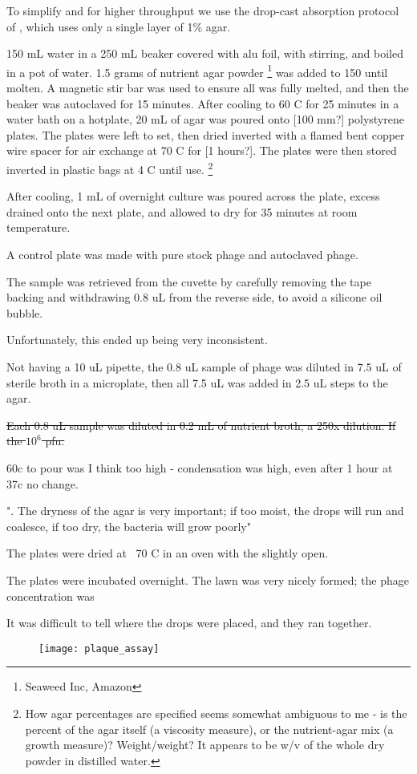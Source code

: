 \documentclass[paper.tex]{subfiles}
\begin{document}
\begin{toolchain}

To simplify and for higher throughput we use the drop-cast absorption protocol of \cite{Simple2018}, which uses only a single layer of 1\% agar.

150 mL water in a 250 mL beaker covered with alu foil, with stirring, and boiled in a pot of water. 1.5 grams of nutrient agar powder \footnote{Seaweed Inc, Amazon} was added to 150  until molten. A magnetic stir bar was used to ensure all was fully melted,
and then the beaker was autoclaved for 15 minutes. After cooling to 60 C for 25 minutes in a water bath on a hotplate, 20 mL of agar was poured onto [100 mm?] polystyrene plates. The plates were left to set, then dried inverted with a flamed bent copper wire spacer for air exchange at 70 C for [1 hours?].
The plates were then stored inverted in plastic bags at 4 C until use.
\footnote{How agar percentages are specified seems somewhat ambiguous to me - is the percent of the agar itself (a viscosity measure), or the nutrient-agar mix (a growth measure)?
	Weight/weight? It appears to be w/v of the whole dry powder in distilled water.}

After cooling, 1 mL of overnight culture was poured across the plate, excess drained onto the next plate, and allowed to dry for 35 minutes at room temperature.

A control plate was made with pure stock phage and autoclaved phage.

The sample was retrieved from the cuvette by carefully removing the tape backing and withdrawing 0.8 uL from the reverse side, to avoid a silicone oil bubble.

Unfortunately, this ended up being very inconsistent.

Not having a 10 uL pipette, the 0.8 uL sample of phage was diluted in 7.5 uL of sterile broth in a microplate, then all 7.5 uL was added in 2.5 uL steps to the agar.

\st{Each 0.8 uL sample was diluted in 0.2 mL of nutrient broth, a 250x dilution. If the $10^6$ pfu.}

60c to pour was I think too high - condensation was high, even after 1 hour at 37c no change.

". The dryness of the agar is very important; if too moist, the
drops will run and coalesce, if too dry, the bacteria will grow
poorly"

The plates were dried at ~70 C in an oven with the slightly open.

The plates were incubated overnight. The lawn was very nicely formed; the phage concentration was

It was difficult to tell where the drops were placed, and they ran together.


\begin{figure}[H]
	\captionsetup{singlelinecheck = false, justification=justified}
	\centering
	\texttt{[image: plaque\_assay]}
\end{figure}



\end{toolchain}
\end{document}
